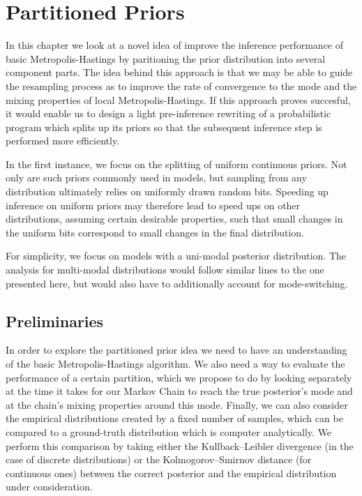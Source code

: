 \chapter{Partitioned Priors}

In this chapter we look at a novel idea of improve the inference performance of basic Metropolis-Hastings by paritioning the prior distribution into several component parts. The idea behind this approach is that we may be able to guide the resampling process as to improve the rate of convergence to the mode and the mixing properties of local Metropolis-Hastings.  If this approach proves succesful, it would enable us to design a light pre-inference rewriting of a probabilistic program which splits up its priors so that the subsequent inference step is performed more efficiently.

In the first instance, we focus on the splitting of uniform continuous priors. Not only are such priors commonly used in models, but sampling from any distribution ultimately relies on uniformly drawn random bits. Speeding up inference on uniform priors may therefore lead to speed ups on other distributions, assuming certain desirable properties, such that small changes in the uniform bits correspond to small changes in the final distribution. 

For simplicity, we focus on models with a uni-modal posterior distribution. The analysis for multi-modal distributions would follow similar lines to the one presented here, but would also have to additionally account for mode-switching.

\section{Preliminaries}

In order to explore the partitioned prior idea we need to have an understanding of the basic Metropolis-Hastings algorithm. We also need a way to evaluate the performance of a certain partition, which we propose to do by looking separately at the time it takes for our Markov Chain to reach the true posterior's mode and at the chain's mixing properties around this mode. Finally, we can also consider the empirical distributions created by a fixed number of samples, which can be compared to a ground-truth distribution which is computer analytically. We perform this comparison by taking either the Kullback–Leibler divergence \cite{kullback1951information} (in the case of discrete distributions) or the Kolmogorov–Smirnov distance \cite{massey1951kolmogorov} (for continuous ones) between the correct posterior and the empirical distribution under consideration. 

